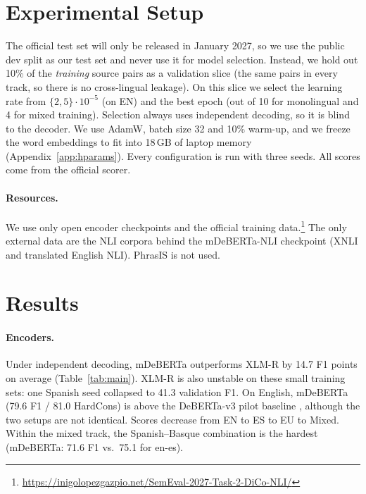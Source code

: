 \section{Experimental Setup}
\label{sec:setup}

The official test set will only be released in January 2027, so we use the public dev split as our test set and never use it for model selection. Instead, we hold out 10\% of the \emph{training} source pairs as a validation slice (the same pairs in every track, so there is no cross-lingual leakage). On this slice we select the learning rate from $\{2,5\}\cdot10^{-5}$ (on EN) and the best epoch (out of 10 for monolingual and 4 for mixed training). Selection always uses independent decoding, so it is blind to the decoder. We use AdamW, batch size 32 and 10\% warm-up, and we freeze the word embeddings to fit into 18\,GB of laptop memory (Appendix~\ref{app:hparams}). Every configuration is run with three seeds. All scores come from the official scorer.

\paragraph{Resources.} We use only open encoder checkpoints and the official training data.\footnote{\url{https://inigolopezgazpio.net/SemEval-2027-Task-2-DiCo-NLI/}} The only external data are the NLI corpora behind the mDeBERTa-NLI checkpoint (XNLI and translated English NLI). PhrasIS is not used.

\section{Results}
\label{sec:results}



\paragraph{Encoders.} Under independent decoding, mDeBERTa outperforms XLM-R by 14.7 F1 points on average (Table~\ref{tab:main}). XLM-R is also unstable on these small training sets: one Spanish seed collapsed to 41.3 validation F1. On English, mDeBERTa (79.6 F1 / 81.0 HardCons) is above the DeBERTa-v3 pilot baseline \citep[75 / 79;][]{apaolaza2026assessing}, although the two setups are not identical. Scores decrease from EN to ES to EU to Mixed. Within the mixed track, the Spanish--Basque combination is the hardest (mDeBERTa: 71.6 F1 vs.\ 75.1 for en-es).

